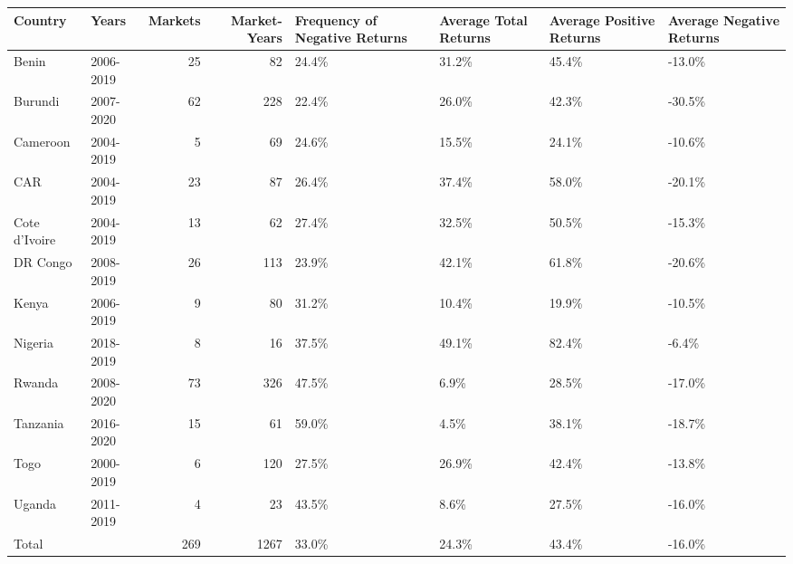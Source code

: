 \begin{table}[ht]
\centering
\begin{tabular}{llrrllll}
  \hline
Country & Years & Markets & Market-Years & Frequency of Negative Returns & Average Total Returns & Average Positive Returns & Average Negative Returns \\ 
  \hline
Benin & 2006-2019 &  25 &  82 & 24.4\% & 31.2\% & 45.4\% & -13.0\% \\ 
  Burundi & 2007-2020 &  62 & 228 & 22.4\% & 26.0\% & 42.3\% & -30.5\% \\ 
  Cameroon & 2004-2019 &   5 &  69 & 24.6\% & 15.5\% & 24.1\% & -10.6\% \\ 
  CAR & 2004-2019 &  23 &  87 & 26.4\% & 37.4\% & 58.0\% & -20.1\% \\ 
  Cote d'Ivoire & 2004-2019 &  13 &  62 & 27.4\% & 32.5\% & 50.5\% & -15.3\% \\ 
  DR Congo & 2008-2019 &  26 & 113 & 23.9\% & 42.1\% & 61.8\% & -20.6\% \\ 
  Kenya & 2006-2019 &   9 &  80 & 31.2\% & 10.4\% & 19.9\% & -10.5\% \\ 
  Nigeria & 2018-2019 &   8 &  16 & 37.5\% & 49.1\% & 82.4\% & -6.4\% \\ 
  Rwanda & 2008-2020 &  73 & 326 & 47.5\% & 6.9\% & 28.5\% & -17.0\% \\ 
  Tanzania & 2016-2020 &  15 &  61 & 59.0\% & 4.5\% & 38.1\% & -18.7\% \\ 
  Togo & 2000-2019 &   6 & 120 & 27.5\% & 26.9\% & 42.4\% & -13.8\% \\ 
  Uganda & 2011-2019 &   4 &  23 & 43.5\% & 8.6\% & 27.5\% & -16.0\% \\ 
  Total &   & 269 & 1267 & 33.0\% & 24.3\% & 43.4\% & -16.0\% \\ 
   \hline
\end{tabular}
\end{table}
